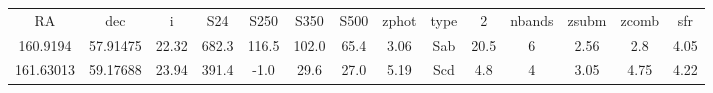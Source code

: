 \begin{table}
\begin{tabular}{cccccccccccccc}
RA & dec & i & S24 & S250 & S350 & S500 & zphot & type & 2 & nbands & zsubm & zcomb & sfr \\
160.9194 & 57.91475 & 22.32 & 682.3 & 116.5 & 102.0 & 65.4 & 3.06 & Sab & 20.5 & 6 & 2.56 & 2.8 & 4.05 \\
161.63013 & 59.17688 & 23.94 & 391.4 & -1.0 & 29.6 & 27.0 & 5.19 & Scd & 4.8 & 4 & 3.05 & 4.75 & 4.22 \\
\end{tabular}
\end{table}
